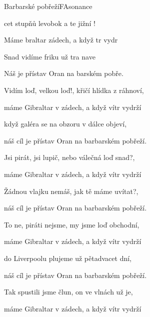 \begin{song}{Barbarské pobřeží}{F}{Asonance}

\begin{SBVerse}

cet stupňů levobok a te jižní !

Máme braltar  zádech, a když tr vydr

Snad vidíme friku už tra nave

Náš  je přístav Oran na barském pobře.

\end{SBVerse}

\begin{SBVerse}

Vidím loď, velkou loď!, křičí hlídka z ráhnoví,

máme Gibraltar v zádech, a když vítr vydrží

když galéra se na obzoru v dálce objeví,

náš cíl je přístav Oran na barbarském pobřeží.

\end{SBVerse}

\begin{SBVerse}

Jsi pirát, jsi lupič, nebo válečná loď snad?,

máme Gibraltar v zádech, a když vítr vydrží

Žádnou vlajku nemáš, jak tě máme uvítat?,

náš cíl je přístav Oran na barbarském pobřeží.

\end{SBVerse}

\begin{SBVerse}

To ne, piráti nejsme, my jsme loď obchodní,

máme Gibraltar v zádech, a když vítr vydrží

do Liverpoolu plujeme už pětadvacet dní,

náš cíl je přístav Oran na barbarském pobřeží.

\end{SBVerse}

\begin{SBVerse}

Tak spustili jsme člun, on ve vlnách už je,

máme Gibraltar v zádech, a když vítr vydrží


\end{SBVerse}
\end{song}
